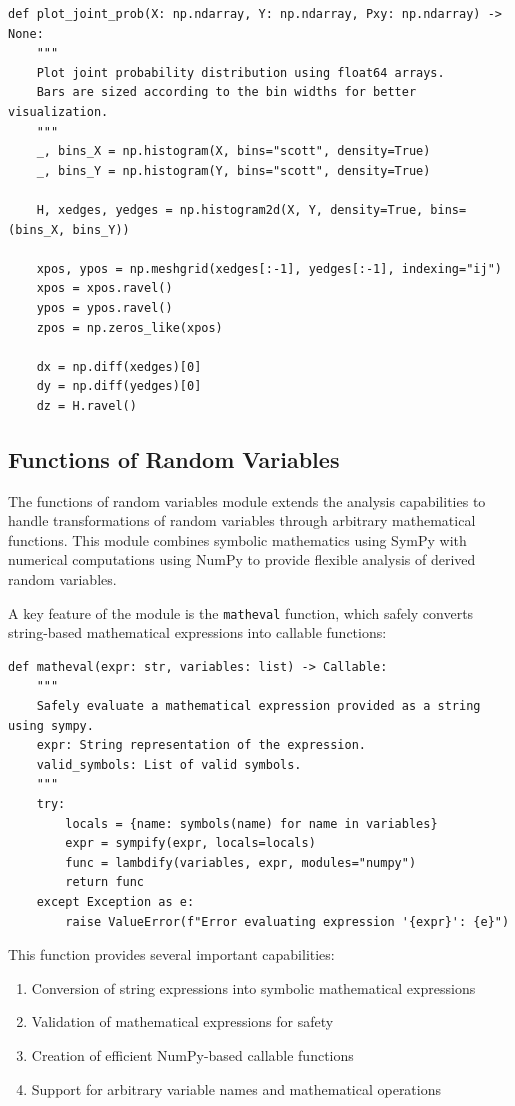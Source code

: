 \documentclass{article}
\begin{document}
\begin{verbatim}
def plot_joint_prob(X: np.ndarray, Y: np.ndarray, Pxy: np.ndarray) -> None:
    """
    Plot joint probability distribution using float64 arrays.
    Bars are sized according to the bin widths for better visualization.
    """
    _, bins_X = np.histogram(X, bins="scott", density=True)
    _, bins_Y = np.histogram(Y, bins="scott", density=True)

    H, xedges, yedges = np.histogram2d(X, Y, density=True, bins=(bins_X, bins_Y))

    xpos, ypos = np.meshgrid(xedges[:-1], yedges[:-1], indexing="ij")
    xpos = xpos.ravel()
    ypos = ypos.ravel()
    zpos = np.zeros_like(xpos)

    dx = np.diff(xedges)[0]
    dy = np.diff(yedges)[0]
    dz = H.ravel()
\end{verbatim}

\subsection{Functions of Random Variables}

The functions of random variables module extends the analysis capabilities to handle transformations of random variables through arbitrary mathematical functions. This module combines symbolic mathematics using SymPy with numerical computations using NumPy to provide flexible analysis of derived random variables.

A key feature of the module is the \texttt{matheval} function, which safely converts string-based mathematical expressions into callable functions:

\begin{verbatim}
def matheval(expr: str, variables: list) -> Callable:
    """
    Safely evaluate a mathematical expression provided as a string using sympy.
    expr: String representation of the expression.
    valid_symbols: List of valid symbols.
    """
    try:
        locals = {name: symbols(name) for name in variables}
        expr = sympify(expr, locals=locals)
        func = lambdify(variables, expr, modules="numpy")
        return func
    except Exception as e:
        raise ValueError(f"Error evaluating expression '{expr}': {e}")
\end{verbatim}

This function provides several important capabilities:
\begin{enumerate}
  \item Conversion of string expressions into symbolic mathematical expressions
  \item Validation of mathematical expressions for safety
  \item Creation of efficient NumPy-based callable functions
  \item Support for arbitrary variable names and mathematical operations
\end{enumerate}
\end{document}
